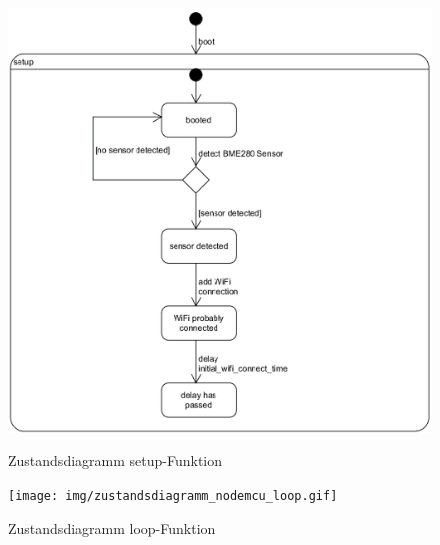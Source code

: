 \label{anh:ablaeufe}
\begin{figure}[H]
    \centering
    \begin{minipage}[t]{1\textwidth}
        \caption{Zustandsdiagramm setup-Funktion}
        \includegraphics[width=1\textwidth]{img/zustandsdiagramm_nodemcu_setup.png}\\
        \label{fig:zust_diag_nodemcu_setup}
    \end{minipage}
\end{figure}
\begin{figure}[H]
    \centering
    \begin{minipage}[t]{1\textwidth}
        \caption{Zustandsdiagramm loop-Funktion}
        \texttt{[image: img/zustandsdiagramm\_nodemcu\_loop.gif]}\\
        \label{fig:zust_diag_nodemcu_loop}
    \end{minipage}
\end{figure}

